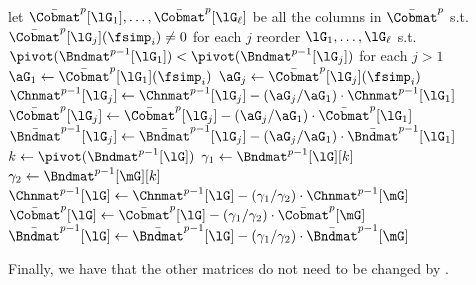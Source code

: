 \begin{algorithm}[h]
\caption{Making columns in $\bar{\Bndmat}^{p-1}$ have distinct pivots}

\begin{algorithmic}[1]
\State let $\bar{\Cobmat}^p[\lG_1],\ldots,\bar{\Cobmat}^p[\lG_\ell]$ be all the columns in
$\bar{\Cobmat}^p$ s.t.\ $\bar{\Cobmat}^p[\lG_j](\fsimp_i)\neq 0$
for each $j$
\State reorder $\lG_1,\ldots,\lG_\ell$ s.t.\ $\pivot({\Bndmat}^{p-1}[\lG_1])<\pivot({\Bndmat}^{p-1}[\lG_j])$
for each $j>1$
\State $\aG_1\leftarrow\bar{\Cobmat}^p[\lG_1](\fsimp_i)$
\label{line:sum-bndmat-for}
\State $\aG_j\leftarrow\bar{\Cobmat}^p[\lG_j](\fsimp_i)$
\State ${\Chnmat}^{p-1}[\lG_j]\leftarrow{\Chnmat}^{p-1}[\lG_j]-(\aG_j/\aG_1)\cdot{\Chnmat}^{p-1}[\lG_1]$
\State $\bar{\Cobmat}^p[\lG_j]\leftarrow\bar{\Cobmat}^p[\lG_j]-(\aG_j/\aG_1)\cdot\bar{\Cobmat}^p[\lG_1]$
\State $\bar{\Bndmat}^{p-1}[\lG_j]\leftarrow\bar{\Bndmat}^{p-1}[\lG_j]-(\aG_j/\aG_1)\cdot\bar{\Bndmat}^{p-1}[\lG_1]$
\EndFor
\label{line:sum-bndmat-while}
\State $k\leftarrow\pivot(\Bndmat^{p-1}[\lG])$\label{line:sum-bndmat-k}
\State $\gamma_1\leftarrow\Bndmat^{p-1}[\lG][k]$
\State $\gamma_2\leftarrow\Bndmat^{p-1}[\mG][k]$
\State ${\Chnmat}^{p-1}[\lG]\leftarrow{\Chnmat}^{p-1}[\lG]-(\gamma_1/\gamma_2)\cdot{\Chnmat}^{p-1}[\mG]$
\State $\bar{\Cobmat}^p[\lG]\leftarrow\bar{\Cobmat}^p[\lG]-(\gamma_1/\gamma_2)\cdot\bar{\Cobmat}^p[\mG]$
\State $\bar{\Bndmat}^{p-1}[\lG]\leftarrow\bar{\Bndmat}^{p-1}[\lG]-(\gamma_1/\gamma_2)\cdot\bar{\Bndmat}^{p-1}[\mG]$
\EndWhile
{}
\end{algorithmic}
\label{algr:sum-bndmat}
\end{algorithm}

Finally, we have that
the other matrices do not need to be changed
by .

